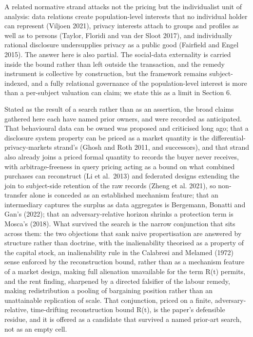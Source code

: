 \documentclass[
  11pt,
]{article}
\begin{document}
A related normative strand attacks not the pricing but the individualist
unit of analysis: data relations create population-level interests that
no individual holder can represent (Viljoen 2021), privacy interests
attach to groups and profiles as well as to persons (Taylor, Floridi and
van der Sloot 2017), and individually rational disclosure undersupplies
privacy as a public good (Fairfield and Engel 2015). The answer here is
also partial. The social-data externality is carried inside the bound
rather than left outside the transaction, and the remedy instrument is
collective by construction, but the framework remains subject-indexed,
and a fully relational governance of the population-level interest is
more than a per-subject valuation can claim; we state this as a limit in
Section 6.

Stated as the result of a search rather than as an assertion, the broad
claims gathered here each have named prior owners, and were recorded as
anticipated. That behavioural data can be owned was proposed and
criticised long ago; that a disclosure system property can be priced as
a market quantity is the differential-privacy-markets strand's (Ghosh
and Roth 2011, and successors), and that strand also already joins a
priced formal quantity to records the buyer never receives, with
arbitrage-freeness in query pricing acting as a bound on what combined
purchases can reconstruct (Li et al.~2013) and federated designs
extending the join to subject-side retention of the raw records (Zheng
et al. 2021), so non-transfer alone is conceded as an established
mechanism feature; that an intermediary captures the surplus as data
aggregates is Bergemann, Bonatti and Gan's (2022); that an
adversary-relative horizon shrinks a protection term is Mosca's (2018).
What survived the search is the narrow conjunction that sits across
them: the two objections that sank naive propertisation are answered by
structure rather than doctrine, with the inalienability theorised as a
property of the capital stock, an inalienability rule in the Calabresi
and Melamed (1972) sense enforced by the reconstruction bound, rather
than as a mechanism feature of a market design, making full alienation
unavailable for the term R(t) permits, and the rent finding, sharpened
by a directed falsifier of the labour remedy, making redistribution a
pooling of bargaining position rather than an unattainable replication
of scale. That conjunction, priced on a finite, adversary-relative,
time-drifting reconstruction bound R(t), is the paper's defensible
residue, and it is offered as a candidate that survived a named
prior-art search, not as an empty cell.
\end{document}
